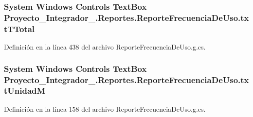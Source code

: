 \hypertarget{class_proyecto___integrador__3_1_1_reportes_1_1_reporte_frecuencia_de_uso_a220671fb7be4b6c864281288bce5fc86}{
\subsubsection[{txt\-T\-Total}]{\setlength{\rightskip}{0pt plus 5cm}System Windows Controls Text\-Box Proyecto\-\_\-\-Integrador\-\_.\-Reportes.\-Reporte\-Frecuencia\-De\-Uso.\-txt\-T\-Total\hspace{0.3cm}{\ttfamily [package]}}}\label{class_proyecto___integrador__3_1_1_reportes_1_1_reporte_frecuencia_de_uso_a220671fb7be4b6c864281288bce5fc86}


Definición en la línea 438 del archivo Reporte\-Frecuencia\-De\-Uso.\-g.\-cs.

\hypertarget{class_proyecto___integrador__3_1_1_reportes_1_1_reporte_frecuencia_de_uso_a5f1eb7192932de54000a607fd13e1c00}{
\subsubsection[{txt\-Unidad\-M}]{\setlength{\rightskip}{0pt plus 5cm}System Windows Controls Text\-Box Proyecto\-\_\-\-Integrador\-\_.\-Reportes.\-Reporte\-Frecuencia\-De\-Uso.\-txt\-Unidad\-M\hspace{0.3cm}{\ttfamily [package]}}}\label{class_proyecto___integrador__3_1_1_reportes_1_1_reporte_frecuencia_de_uso_a5f1eb7192932de54000a607fd13e1c00}


Definición en la línea 158 del archivo Reporte\-Frecuencia\-De\-Uso.\-g.\-cs.

